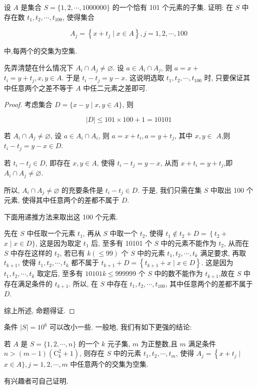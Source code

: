 \begin{example}
设 $A$ 是集合 $S=\{1,2, \cdots, 1000000\}$ 的一个恰有 101 个元素的子集. 证明: 在 $S$ 中存在数 $t_{1}, t_{2}, \cdots, t_{100}$, 使得集合

$$
A_{j}=\left\{x+t_{j} \mid x \in A\right\}, j=1,2, \cdots, 100
$$

中,每两个的交集为空集.
\end{example}
\begin{analysis}
先弄清楚在什么情况下 $A_{i} \cap A_{j} \neq \varnothing$. 设 $a \in A_{i} \cap A_{j}$, 则 $a=x+$ $t_{i}=y+t_{j}, x, y \in A$. 于是 $t_{i}-t_{j}=y-x$. 这说明选取 $t_{1}, t_{2}, \cdots, t_{100}$ 时, 只要保证其中任意两个之差不等于 $A$ 中任二元素之差即可.
\end{analysis}

\begin{proof}
考虑集合 $D=\{x-y \mid x, y \in A\}$, 则

$$
|D| \leqslant 101 \times 100+1=10101
$$

若 $A_{i} \cap A_{j} \neq \varnothing$, 设 $a \in A_{i} \cap A_{i}$, 则 $a=x+t_{i}, a=y+t_{j}$, 其中 $x, y \in$ $A$,则 $t_{i}-t_{j}=y-x \in D$.

若 $t_{i}-t_{j} \in D$, 即存在 $x, y \in A$, 使得 $t_{i}-t_{j}=y-x$, 从而 $x+t_{i}=y+t_{j}$,即 $A_{i} \cap A_{j} \neq \varnothing$.

所以, $A_{i} \cap A_{j} \neq \varnothing$ 的充要条件是 $t_{i}-t_{j} \in D$. 于是, 我们只需在集 $S$ 中取出 100 个元素, 使得其中任意两个的差都不属于 $D$.

下面用递推方法来取出这 100 个元素.

先在 $S$ 中任取一个元素 $t_{1}$, 再从 $S$ 中取一个 $t_{2}$, 使得 $t_{1} \notin t_{2}+D=\left\{t_{2}+\right.$ $x \mid x \in D\}$, 这是因为取定 $t_{1}$ 后, 至多有 10101 个 $S$ 中的元素不能作为 $t_{2}$, 从而在 $S$ 中存在这样的 $t_{2}$, 若已有 $k(\leqslant 99)$ 个 $S$ 中的元素 $t_{1}, t_{2}, \cdots, t_{k}$ 满足要求, 再取 $t_{k+1}$, 使得 $t_{1}, t_{2}, \cdots, t_{k}$ 都不属于 $t_{k+1}+D=\left\{t_{k+1}+x \mid x \in D\right\}$. 这是因为 $t_{1}, t_{2}, \cdots, t_{k}$ 取定后, 至多有 $10101 k \leqslant 999999$ 个 $S$ 中的数不能作为 $t_{k+1}$,故在 $S$ 中存在满足条件的 $t_{k+1}$. 所以, 在 $S$ 中存在 $t_{1}, t_{2}, \cdots, t_{100}$, 其中任意两个的差都不属于 $D$.

综上所述, 命题得证.
\end{proof}

\begin{note}
条件 $|S|=10^{6}$ 可以改小一些. 一般地, 我们有如下更强的结论:

若 $A$ 是 $S=\{1,2, \cdots, n\}$ 的一个 $k$ 元子集, $m$ 为正整数,且 $m$ 满足条件 $n>(m-1)\left(\mathrm{C}_{k}^{2}+1\right)$, 则存在 $S$ 中的元素 $t_{1}, t_{2}, \cdots, t_{m}$, 使得 $A_{j}=\left\{x+t_{j} \mid\right.$ $x \in A\}, j=1,2, \cdots, m$ 中任意两个的交集为空集.

有兴趣者可自己证明.
\end{note}

